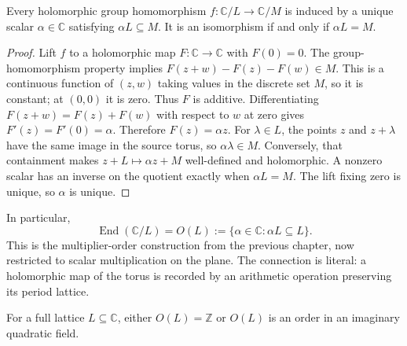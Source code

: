 \begin{proposition}
\label{prop:torus-hom}
Every holomorphic group homomorphism
$f:\mathbb C/L\to\mathbb C/M$ is induced by a unique scalar
$\alpha\in\mathbb C$ satisfying $\alpha L\subseteq M$.
It is an isomorphism if and only if $\alpha L=M$.
\end{proposition}

\begin{proof}
Lift $f$ to a holomorphic map $F:\mathbb C\to\mathbb C$ with
$F(0)=0$. The group-homomorphism property implies
$F(z+w)-F(z)-F(w)\in M$. This is a continuous function of
$(z,w)$ taking values in the discrete set $M$, so it is constant;
at $(0,0)$ it is zero. Thus $F$ is additive. Differentiating
$F(z+w)=F(z)+F(w)$ with respect to $w$ at zero gives
$F'(z)=F'(0)=\alpha$. Therefore $F(z)=\alpha z$.
For $\lambda\in L$, the points $z$ and $z+\lambda$ have the
same image in the source torus, so $\alpha\lambda\in M$.
Conversely, that containment makes $z+L\mapsto\alpha z+M$
well-defined and holomorphic. A nonzero scalar has an inverse
on the quotient exactly when $\alpha L=M$. The lift fixing
zero is unique, so $\alpha$ is unique.
\end{proof}

In particular,
\[
 \operatorname{End}(\mathbb C/L)
   =O(L):=\{\alpha\in\mathbb C:\alpha L\subseteq L\}.
\]
This is the multiplier-order construction from the previous chapter,
now restricted to scalar multiplication on the plane. The
connection is literal: a holomorphic map of the torus is recorded
by an arithmetic operation preserving its period lattice.

\begin{theorem}
\label{thm:cm-dichotomy}
For a full lattice $L\subseteq\mathbb C$, either $O(L)=\mathbb Z$
or $O(L)$ is an order in an imaginary quadratic field.
\end{theorem}

